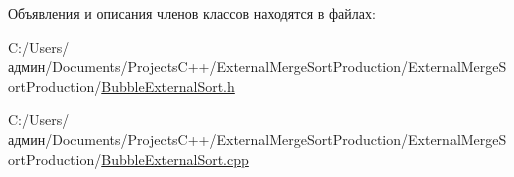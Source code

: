 Объявления и описания членов классов находятся в файлах\+:\begin{DoxyCompactItemize}
\item 
C\+:/\+Users/админ/\+Documents/\+Projects\+C++/\+External\+Merge\+Sort\+Production/\+External\+Merge\+Sort\+Production/\hyperlink{_bubble_external_sort_8h}{Bubble\+External\+Sort.\+h}\item 
C\+:/\+Users/админ/\+Documents/\+Projects\+C++/\+External\+Merge\+Sort\+Production/\+External\+Merge\+Sort\+Production/\hyperlink{_bubble_external_sort_8cpp}{Bubble\+External\+Sort.\+cpp}\end{DoxyCompactItemize}
